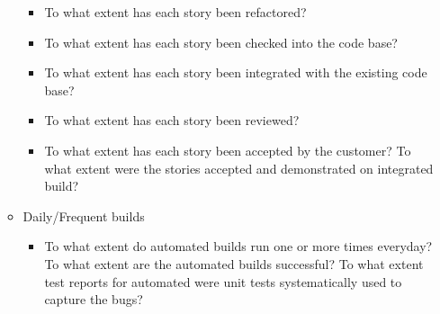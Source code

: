 \begin{itemize}
\begin{itemize}
\begin{itemize}
					\item To what extent has each story been refactored? 
					\item To what extent has each story been checked into the code base? 
					\item To what extent has each story been integrated with the existing code base? 
					\item To what extent has each story been reviewed? 
					\item To what extent has each story been accepted by the customer? 
					\addition To what extent were the stories accepted and demonstrated on integrated build?
				\end{itemize}
			\item Daily/Frequent builds
				\begin{itemize}
					\item To what extent do automated builds run one or more times everyday?
					\addition To what extent are the automated builds successful?
					\addition To what extent test reports for automated were unit tests  systematically used to capture the bugs?
				\end{itemize}
		\end{itemize}


\end{itemize}
